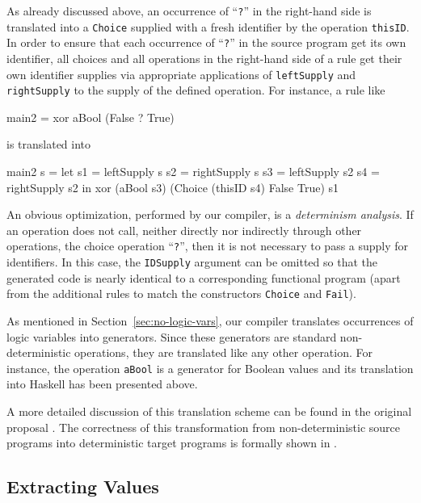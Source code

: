 \documentclass{llncs}
\newcommand{\code}[1]{\mbox{\small\texttt{#1}}}
\newcommand{\ccode}[1]{``\code{#1}''}
\begin{document}
As already discussed above, an occurrence of \ccode{?}
in the right-hand side is translated into a \code{Choice} supplied
with a fresh identifier by the operation \code{thisID}.
In order to ensure that each occurrence of \ccode{?} in the source program
get its own identifier, all choices and all operations in the right-hand
side of a rule get their own identifier supplies via appropriate
applications of \code{leftSupply} and \code{rightSupply}
to the supply of the defined operation.
For instance, a rule like
\begin{curry}
  main2 = xor aBool (False ? True)
\end{curry}
is translated into
\begin{haskell}
  main2 s = let s1 = leftSupply  s
                s2 = rightSupply s
                s3 = leftSupply  s2
                s4 = rightSupply s2
             in xor (aBool s3) (Choice (thisID s4) False True) s1
\end{haskell}
An obvious optimization, performed by our compiler,
is a \emph{determinism analysis}.
If an operation does not call, neither directly nor indirectly through
other operations, the choice operation \ccode{?},
then it is not necessary to pass a supply for identifiers.
In this case, the \code{IDSupply} argument can be omitted
so that the generated code is nearly identical to a corresponding
functional program (apart from the additional rules to match
the constructors \code{Choice} and \code{Fail}).

As mentioned in Section~\ref{sec:no-logic-vars},
our compiler translates occurrences of logic variables
into generators. Since these generators are standard
non-deterministic operations, they are translated like any other operation.
For instance, the operation \code{aBool} is a generator for
Boolean values and its translation into Haskell has been presented above.

A more detailed discussion of this translation scheme can be found
in the original proposal \cite{BrasselFischer08IFL}.
The correctness of this transformation from non-deterministic source programs
into deterministic target programs is formally shown
in \cite{Brassel11Thesis}.


\subsection{Extracting Values}
\end{document}
